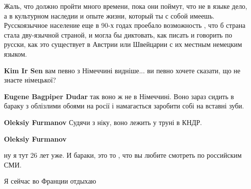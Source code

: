 \begin{itemize}
Жаль, что должно пройти много времени, пока они поймут, что не в языке дело, а
в культурном наследии и опыте жизни, который ты с собой имеешь. Русскоязычное
население еще в 90-х годах проебало возможность , что б страна стала
дву-язычной страной, и могла бы диктовать, как писать и говорить по русски, как
это существует в Австрии или Швейцарии с их местным немецким языком.

\begin{itemize}
 
\textbf{Kim Ir Sen} вам певно з Німеччині видніше... ви певно хочете сказати, що не знаєте німецької?

 
\textbf{Eugene Bagpiper Dudar} так воно ж не в Німеччині. Воно зараз сидить в бараку з облізлими обоями на росії і намагається заробити собі на вставні зуби.

 
\textbf{Oleksiy Furmanov} Судячи з ніку, воно лежить у труні в КНДР.

 
\textbf{Oleksiy Furmanov} 

ну я тут 26 лет уже. И бараки, это то , что вы любите смотреть по российским
СМИ. 🤪

Я сейчас во Франции отдыхаю

 

\end{itemize}
\end{itemize}
